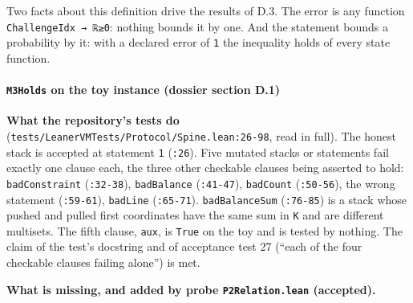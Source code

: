 Two facts about this definition drive the results of D.3. The error is any function \texttt{ChallengeIdx → ℝ≥0}: nothing bounds it by one. And the statement bounds a probability by it: with a declared error of \texttt{1} the inequality holds of every state function.

\paragraph{\texttt{M3Holds} on the toy instance (dossier section D.1)}\label{sec:gen-spine-D1}

\textbf{What the repository's tests do} (\texttt{t\allowbreak{}e\allowbreak{}s\allowbreak{}t\allowbreak{}s\allowbreak{}/\allowbreak{}L\allowbreak{}e\allowbreak{}a\allowbreak{}n\allowbreak{}e\allowbreak{}r\allowbreak{}V\allowbreak{}M\allowbreak{}T\allowbreak{}e\allowbreak{}s\allowbreak{}t\allowbreak{}s\allowbreak{}/\allowbreak{}P\allowbreak{}r\allowbreak{}o\allowbreak{}t\allowbreak{}o\allowbreak{}c\allowbreak{}o\allowbreak{}l\allowbreak{}/\allowbreak{}S\allowbreak{}p\allowbreak{}i\allowbreak{}n\allowbreak{}e\allowbreak{}.\allowbreak{}l\allowbreak{}e\allowbreak{}a\allowbreak{}n\allowbreak{}:\allowbreak{}2\allowbreak{}6\allowbreak{}-{}\allowbreak{}9\allowbreak{}8}, read in full). The honest stack is accepted at statement \texttt{1} (\texttt{:26}). Five mutated stacks or statements fail exactly one clause each, the three other checkable clauses being asserted to hold: \texttt{badConstraint} (\texttt{:32-{}38}), \texttt{badBalance} (\texttt{:41-{}47}), \texttt{badCount} (\texttt{:50-{}56}), the wrong statement (\texttt{:59-{}61}), \texttt{badLine} (\texttt{:65-{}71}). \texttt{badBalanceSum} (\texttt{:76-{}85}) is a stack whose pushed and pulled first coordinates have the same sum in \texttt{K} and are different multisets. The fifth clause, \texttt{aux}, is \texttt{True} on the toy and is tested by nothing. The claim of the test's docstring and of acceptance test 27 (\enquote{each of the four checkable clauses failing alone}) is met.

\textbf{What is missing, and added by probe \texttt{P2Relation.\allowbreak{}lean} (accepted).}

